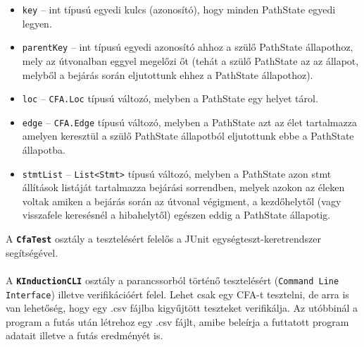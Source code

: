\begin{itemize}
	\item \texttt{key} -- int típusú egyedi kulcs (azonosító), hogy minden PathState egyedi legyen.
	\item \texttt{parentKey} -- int típusú egyedi azonosító ahhoz a szülő PathState állapothoz, mely az útvonalban eggyel megelőzi őt (tehát a szülő PathState az az állapot, melyből a bejárás során eljutottunk ehhez a PathState állapothoz).
	\item \texttt{loc} -- \texttt{CFA.Loc} típusú változó, melyben a PathState egy helyet tárol.
	\item \texttt{edge} -- \texttt{CFA.Edge} típusú változó, melyben a PathState azt az élet tartalmazza amelyen keresztül a szülő PathState állapotból eljutottunk ebbe a PathState állapotba.
	\item \texttt{stmtList} -- \texttt{List<Stmt>} típusú változó, melyben a PathState azon stmt állítások listáját tartalmazza bejárási sorrendben, melyek azokon az éleken voltak amiken a bejárás során az útvonal végigment, a kezdőhelytől (vagy visszafele keresésnél a hibahelytől) egészen eddig a PathState állapotig.
\end{itemize}
A \textbf{\texttt{CfaTest}} osztály a tesztelésért felelős a JUnit egységteszt-keretrendszer segítségével.
\\
\\
A \textbf{\texttt{KInductionCLI}} osztály a parancssorból történő tesztelésért (\texttt{Command Line Interface}) illetve verifikációért felel. Lehet csak egy CFA-t tesztelni, de arra is van lehetőség, hogy egy .csv fájlba kigyűjtött teszteket verifikálja. Az utóbbinál a program a futás után létrehoz egy .csv fájlt, amibe beleírja a futtatott program adatait illetve a futás eredményét is.

